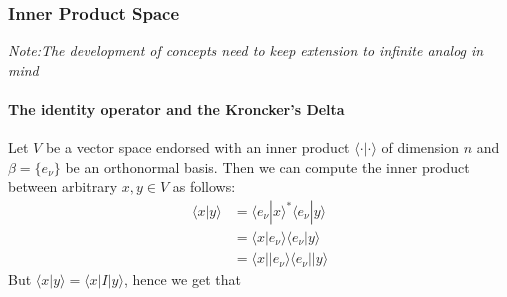 \subsubsection{Inner Product Space}

\textit{Note:The development of concepts need to keep extension to infinite analog in mind}

\paragraph{The identity operator and the Kroncker's Delta}

Let $V$ be a vector space endorsed with an inner product $\langle\cdot| \cdot \rangle$ of dimension $n$ and $\beta = \{e_\nu\}$ be an orthonormal basis. Then we can compute the inner product between arbitrary $x,y\in V$ as follows:
\begin{equation}
\begin{aligned}
\langle x | y \rangle  &= \langle e_{\nu} | x \rangle^* \langle e_{\nu} | y\rangle \\ 
&= \langle x | e_{\nu} \rangle \langle e_{\nu} | y\rangle \\
&= \langle x \lvert |e_{\nu} \rangle \langle e_{\nu}|  \rvert y\rangle
\end{aligned}
\end{equation}
But $\langle x | y \rangle = \langle x | I | y \rangle$, hence we get that

